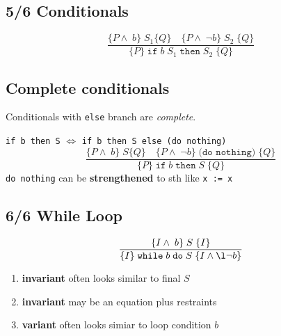 \subsection*{5/6 Conditionals}
\begin{displaymath}
  \frac{\{P \land\; b\}\;S_{1}\{Q\} \quad \{P \land \;\neg b\}\;S_{2}\;\{Q\}}{\{P\}\;\texttt{if}\;b\;S_{1}\;\texttt{then}\;S_{2}\;\{Q\}}
\end{displaymath}
%

\subsection*{Complete conditionals}
Conditionals with \texttt{else} branch are \emph{complete}.

\texttt{if b then S} $\Longleftrightarrow$ \texttt{if b then S else (do nothing)}
\begin{displaymath}
  \frac{\{P \land\; b\}\;S\{Q\} \quad \{P \land \;\neg b\}\;\texttt{(do nothing)}\;\{Q\}}{\{P\}\;\texttt{if}\;b\;\texttt{then}\;S\;\{Q\}}
\end{displaymath}
\texttt{do nothing} can be \textbf{strengthened} to sth like \verb|x := x|

\subsection*{6/6 While Loop}
\begin{displaymath}
  \frac{\{I \land\; b\}\;S\;\{I\}}{\{I\}\;\texttt{while}\;b\;\texttt{do}\;S\;\{I \land\l \neg b\}}
\end{displaymath}
\begin{enumerate}
\item \textbf{invariant} often looks similar to final $S$
\item \textbf{invariant} may be an equation plus restraints
\item \textbf{variant} often looks simiar to loop condition $b$
\end{enumerate}
